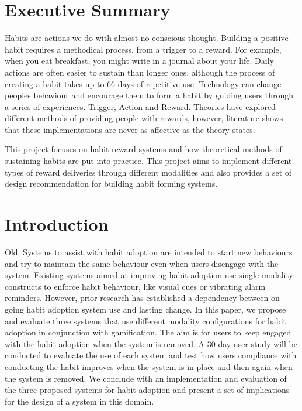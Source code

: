 

\section{Executive Summary}

Habits are actions we do with almost no conscious thought. Building a positive habit requires a methodical process, from a trigger to a reward. For example, when you eat breakfast, you might write in a journal about your life. Daily actions are often easier to sustain than longer ones, although the process of creating a habit takes up to 66 days of repetitive use. Technology can change peoples behaviour and encourage them to form a habit by guiding users through a series of experiences. Trigger, Action and Reward. Theories have explored different methods of providing people with rewards, however, literature shows that these implementations are never as affective as the theory states.

This project focuses on habit reward systems and how theoretical methods of sustaining habits are put into practice. This project aims to implement different types of reward deliveries through different modalities and also provides a set of design recommendation for building habit forming systems.


\section{Introduction}

Old: Systems to assist with habit adoption are intended to start new behaviours and try to maintain the same behaviour even when users disengage with the system. Existing systems aimed at improving habit adoption use single modality constructs to enforce habit behaviour, like visual cues or vibrating alarm reminders. However, prior research has established a dependency between on-going habit adoption system use and lasting change. In this paper, we propose and evaluate three systems that use different modality configurations for habit adoption in conjunction with gamification. The aim is for users to keep engaged with the habit adoption when the system is removed. A 30 day user study will be conducted to evaluate the use of each system and test how users compliance with conducting the habit improves when the system is in place and then again when the system is removed. We conclude with an implementation and evaluation of the three proposed systems for habit adoption and present a set of implications for the design of a system in this domain.

